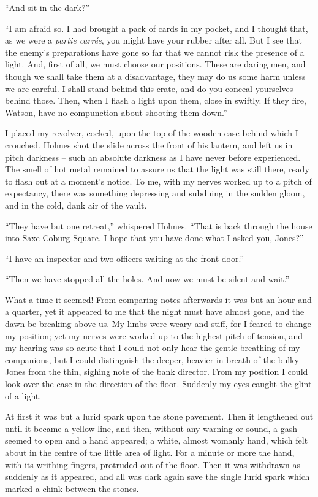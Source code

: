 “And sit in the dark?”

“I am afraid so. I had brought a pack of cards in my
pocket, and I thought that, as we were a \textit{partie carrée}, you
might have your rubber after all. But I see that the enemy’s
preparations have gone so far that we cannot risk the presence
of a light. And, first of all, we must choose our positions.
These are daring men, and though we shall take them
at a disadvantage, they may do us some harm unless we are
careful. I shall stand behind this crate, and do you conceal
yourselves behind those. Then, when I flash a light upon
them, close in swiftly. If they fire, Watson, have no compunction
about shooting them down.”

I placed my revolver, cocked, upon the top of the wooden
case behind which I crouched. Holmes shot the slide across
the front of his lantern, and left us in pitch darkness -- such
an absolute darkness as I have never before experienced.
The smell of hot metal remained to assure us that the light
was still there, ready to flash out at a moment’s notice. To
me, with my nerves worked up to a pitch of expectancy, there
was something depressing and subduing in the sudden gloom,
and in the cold, dank air of the vault.

“They have but one retreat,” whispered Holmes. “That
is back through the house into Saxe-Coburg Square. I hope
that you have done what I asked you, Jones?”

“I have an inspector and two officers waiting at the front
door.”

“Then we have stopped all the holes. And now we must
be silent and wait.”

What a time it seemed! From comparing notes afterwards
it was but an hour and a quarter, yet it appeared to me that
the night must have almost gone, and the dawn be breaking
above us. My limbs were weary and stiff, for I feared to
change my position; yet my nerves were worked up to the
highest pitch of tension, and my hearing was so acute that I
could not only hear the gentle breathing of my companions,
but I could distinguish the deeper, heavier in-breath of the
bulky Jones from the thin, sighing note of the bank director.
From my position I could look over the case in the direction
of the floor. Suddenly my eyes caught the glint of a light.

At first it was but a lurid spark upon the stone pavement.
Then it lengthened out until it became a yellow line, and
then, without any warning or sound, a gash seemed to open
and a hand appeared; a white, almost womanly hand, which
felt about in the centre of the little area of light. For a minute
or more the hand, with its writhing fingers, protruded out
of the floor. Then it was withdrawn as suddenly as it appeared,
and all was dark again save the single lurid spark
which marked a chink between the stones.

